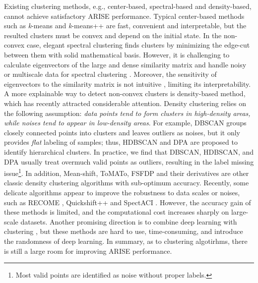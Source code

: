 \documentclass[letterpaper]{article} \usepackage{aaai22}  \usepackage{times}  \usepackage{helvet}  \usepackage{courier}  \usepackage[hyphens]{url}  \usepackage{graphicx} \urlstyle{rm} \def\UrlFont{\rm}  \usepackage{natbib}  \usepackage{caption} \DeclareCaptionStyle{ruled}{labelfont=normalfont,labelsep=colon,strut=off} \frenchspacing  \setlength{\pdfpagewidth}{8.5in}  \setlength{\pdfpageheight}{11in}  \usepackage{subfigure}
\begin{document}
Existing clustering methods, e.g., center-based, spectral-based and density-based, cannot achieve satisfactory ARISE performance. Typical center-based methods such as \textit{k}-means \cite{steinhaus1956division, lloyd1982least} and \textit{k}-means++ \cite{arthur2006k, lattanzi2019better} are fast, convenient and interpretable, but the resulted clusters must be convex and depend on the initial state. In the non-convex case, elegant spectral clustering \cite{dhillon2004kernel} finds clusters by minimizing the edge-cut between them with solid mathematical basis. However, it is challenging to calculate eigenvectors of the large and dense similarity matrix and handle noisy or multiscale data for spectral clustering \cite{nadler2006fundamental}. Moreover, the sensitivity of eigenvectors to the similarity matrix is not intuitive \cite{meila2016spectral}, limiting its interpretability. A more explainable way to detect non-convex clusters is density-based method, which has recently attracted considerable attention. Density clustering relies on the following assumption: \textit{data points tend to form clusters in high-density areas, while noises tend to appear in low-density areas}. For example, DBSCAN \cite{ester1996density} groups closely connected points into clusters and leaves outliers as noises, but it only provides \textit{flat} labeling of samples; thus, HDBSCAN \cite{campello2013density, campello2015hierarchical, mcinnes2017accelerated} and DPA \cite{d2021automatic} are proposed to identify hierarchical clusters. In practice, we find that DBSCAN, HDBSCAN, and DPA usually treat overmuch valid points as outliers, resulting in the label missing issue\footnote{Most valid points are identified as noise without proper labels.}. In addition, Mean-shift, ToMATo, FSFDP and their derivatives \cite{comaniciu2002mean, chazal2013persistence, rodriguez2014clustering, ezugwu2021automatic} are other classic density clustering algorithms with sub-optimum accuracy. Recently, some delicate algorithms appear to improve the robustness to data scales or noises, such as RECOME \cite{geng2018recome}, Quickshift++ \cite{jiang2018quickshift++} and SpectACI \cite{hess2019spectacl}. However, the accuracy gain of these methods is limited, and the computational cost increases sharply on large-scale datasets.  Another promising direction is to combine deep learning with clustering \cite{hershey2016deep,caron2018deep,wang2018alternative,zhan2020online}, but these methods are hard to use, time-consuming, and introduce the randomness of deep learning. In summary, as to clustering algotirhms, there is still a large room for improving ARISE performance.
\end{document}

